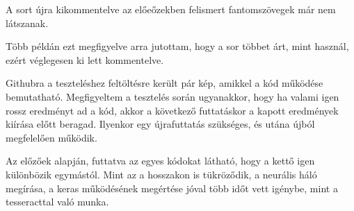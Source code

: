 \documentclass[hidelinks,12pt,a4paper]{report}
\begin{document}

A sort újra kikommentelve az előeőzekben felismert fantomszövegek már nem látszanak. 


Több példán ezt megfigyelve arra jutottam, hogy a sor többet árt, mint használ, ezért véglegesen ki lett kommentelve.

Githubra a teszteléshez feltöltésre került pár kép, amikkel a kód működése bemutatható. Megfigyeltem a tesztelés során ugyanakkor, hogy ha valami igen rossz eredményt ad a kód, akkor a következő futtatáskor a kapott eredmények kiírása előtt beragad. Ilyenkor egy újrafuttatás szükséges, és utána újból megfelelően működik.


Az előzőek alapján, futtatva az egyes kódokat látható, hogy a kettő igen különbözik egymástól. Mint az a hosszakon is tükröződik, a neurális háló megírása, a keras működésének megértése jóval több időt vett igénybe, mint a tesseracttal való munka.


	

	
\end{document}
